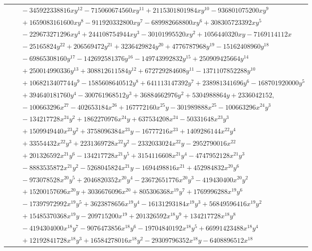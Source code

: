 \documentclass[11pt]{article}
\begin{document}
\begin{longtable}{@{}ll@{}}
 & $\quad -345922338816xy^{12}-715060674560xy^{11}+2115301801984xy^{10}-936801075200xy^{9}$\\
 & $\quad +1659083161600xy^{8}-911920332800xy^{7}-689982668800xy^{6}+308305723392xy^{5}$\\
 & $\quad -229673271296xy^{4}+244108754944xy^{3}-30101995520xy^{2}+1056440320xy-7169114112x$\\
 & $\quad -25165824y^{22}+206569472y^{21}+3236429824y^{20}+4776787968y^{19}-15162408960y^{18}$\\
 & $\quad -69865308160y^{17}-142692581376y^{16}-149743992832y^{15}+250909425664y^{14}$\\
 & $\quad +250014990336y^{13}+308812611584y^{12}+672729284608y^{11}-1371107852288y^{10}$\\
 & $\quad +1068213407744y^{9}-1585608640512y^{8}+641113147392y^{7}+238981341696y^{6}-168701920000y^{5}$\\
 & $\quad +394640181760y^{4}-300761968512y^{3}+36884662976y^{2}+5304988864y+2336042152,$\\
 & $\quad -100663296x^{27}-402653184x^{26}+167772160x^{25}y-301989888x^{25}-100663296x^{24}y^{3}$\\
 & $\quad -134217728x^{24}y^{2}+1862270976x^{24}y+637534208x^{24}-50331648x^{23}y^{3}$\\
 & $\quad +1509949440x^{23}y^{2}+3758096384x^{23}y-16777216x^{23}+1409286144x^{22}y^{4}$\\
 & $\quad +33554432x^{22}y^{3}+2231369728x^{22}y^{2}-2332033024x^{22}y-2952790016x^{22}$\\
 & $\quad +201326592x^{21}y^{6}-134217728x^{21}y^{5}+3154116608x^{21}y^{4}-4747952128x^{21}y^{3}$\\
 & $\quad -8883535872x^{21}y^{2}-5268045824x^{21}y-1694498816x^{21}+452984832x^{20}y^{6}$\\
 & $\quad -973078528x^{20}y^{5}+2046820352x^{20}y^{4}-23672651776x^{20}y^{3}-419430400x^{20}y^{2}$\\
 & $\quad +15200157696x^{20}y+3036676096x^{20}+805306368x^{19}y^{7}+1769996288x^{19}y^{6}$\\
 & $\quad -17397972992x^{19}y^{5}+3623878656x^{19}y^{4}-16131293184x^{19}y^{3}+56849596416x^{19}y^{2}$\\
 & $\quad +15485370368x^{19}y-209715200x^{19}+201326592x^{18}y^{9}+134217728x^{18}y^{8}$\\
 & $\quad -4194304000x^{18}y^{7}-9076473856x^{18}y^{6}-19704840192x^{18}y^{5}+66991423488x^{18}y^{4}$\\
 & $\quad +12192841728x^{18}y^{3}+16584278016x^{18}y^{2}-29309796352x^{18}y-6408896512x^{18}$\\

\end{longtable}
\end{document}
